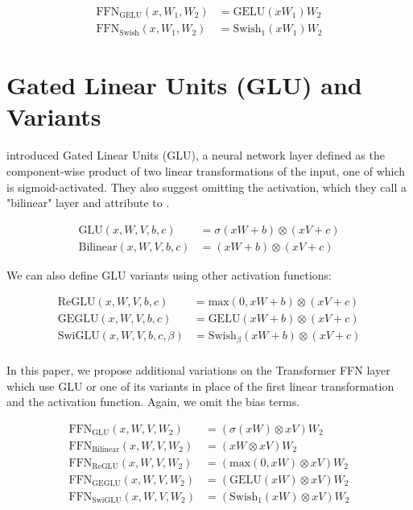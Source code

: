 \documentclass{article}
\begin{document}
\begin{equation}
\begin{split}
\textrm{FFN}_\textrm{GELU}(x, W_1, W_2) & = \textrm{GELU}(xW_1)W_2 \\
\textrm{FFN}_\textrm{Swish}(x, W_1, W_2) & = \textrm{Swish}_1(xW_1)W_2
\end{split}
\end{equation}

\section{Gated Linear Units (GLU) and Variants}

\citep{dauphin2016} introduced Gated Linear Units (GLU), a neural network layer defined as the component-wise product of two linear transformations of the input, one of which is sigmoid-activated.  They also suggest omitting the activation, which they call a "bilinear" layer and attribute to \citep{mnih2007three}.

\begin{equation}
\begin{split}
\textrm{GLU}(x, W, V, b, c) & = \sigma(xW + b) \otimes (xV + c) \\
\textrm{Bilinear}(x, W, V, b, c) & = (xW + b) \otimes (xV + c)
\end{split}
\end{equation}

We can also define GLU variants using other activation functions:

\begin{equation}
\begin{split}
\textrm{ReGLU}(x, W, V, b, c) & = \textrm{max}(0, xW + b) \otimes (xV + c) \\
\textrm{GEGLU}(x, W, V, b, c) & = \textrm{GELU}(xW + b) \otimes (xV + c) \\
\textrm{SwiGLU}(x, W, V, b, c, \beta) & = \textrm{Swish}_\beta(xW + b) \otimes (xV + c) \\
\end{split}
\end{equation}

In this paper, we propose additional variations on the Transformer FFN layer which use GLU or one of its variants in place of the first linear transformation and the activation function.  Again, we omit the bias terms.

\begin{equation}
\begin{split}
\textrm{FFN}_\textrm{GLU}(x, W, V, W_2) & = (\sigma(xW) \otimes xV)W_2 \\
\textrm{FFN}_\textrm{Bilinear}(x, W, V, W_2) & = (xW \otimes xV)W_2 \\
\textrm{FFN}_\textrm{ReGLU}(x, W, V, W_2) & = (\textrm{max}(0, xW) \otimes xV)W_2 \\
\textrm{FFN}_\textrm{GEGLU}(x, W, V, W_2) & = (\textrm{GELU}(xW) \otimes xV)W_2 \\
\textrm{FFN}_\textrm{SwiGLU}(x, W, V, W_2) & = (\textrm{Swish}_1(xW) \otimes xV)W_2 \\
\end{split}
\end{equation}
\end{document}

